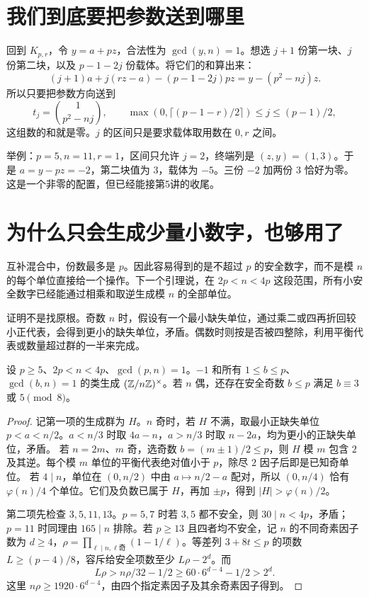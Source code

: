 \section{我们到底要把参数送到哪里}
回到 $K_{p,r}$，令 $y=a+pz$，合法性为 $\gcd(y,n)=1$。想选 $j+1$ 份第一块、$j$ 份第二块，以及 $p-1-2j$ 份载体。将它们的和算出来：
\[
(j+1)a+j(rz-a)-(p-1-2j)pz=y-(p^2-nj)z.
\]
所以只要把参数方向送到
\begin{equation}\label{eq:terminal}
t_j=\binom{1}{p^2-nj},\qquad
\max(0,\lceil(p-1-r)/2\rceil)\le j\le(p-1)/2,
\end{equation}
这组数的和就是零。$j$ 的区间只是要求载体取用数在 $0,r$ 之间。

举例：$p=5,n=11,r=1$，区间只允许 $j=2$，终端列是 $(z,y)=(1,3)$。于是 $a=y-pz=-2$，第二块值为 $3$，载体为 $-5$。三份 $-2$ 加两份 $3$ 恰好为零。这是一个非零的配置，但已经能接第5讲的收尾。

\section{为什么只会生成少量小数字，也够用了}
互补混合中，份数最多是 $p$。因此容易得到的是不超过 $p$ 的安全数字，而不是模 $n$ 的每个单位直接给一个操作。下一个引理说，在 $2p<n<4p$ 这段范围，所有小安全数字已经能通过相乘和取逆生成模 $n$ 的全部单位。

证明不是找原根。奇数 $n$ 时，假设有一个最小缺失单位，通过乘二或四再折回较小正代表，会得到更小的缺失单位，矛盾。偶数时则按是否被四整除，利用平衡代表或数量超过群的一半来完成。
\begin{lemma}[小数字生成模n单位群]\label{lem:small-units}
设 $p\ge5$、$2p<n<4p$、$\gcd(p,n)=1$。$-1$ 和所有 $1\le b\le p$、$\gcd(b,n)=1$ 的类生成 $(\mathbb Z/n\mathbb Z)^\times$。若 $n$ 偶，还存在安全奇数 $b\le p$ 满足 $b\equiv3$ 或 $5\pmod8$。
\end{lemma}
\begin{proof}
记第一项的生成群为 $H$。$n$ 奇时，若 $H$ 不满，取最小正缺失单位 $p<a<n/2$。$a<n/3$ 时取 $4a-n$，$a>n/3$ 时取 $n-2a$，均为更小的正缺失单位，矛盾。
若 $n=2m$、$m$ 奇，选奇数 $b=(m\pm1)/2\le p$，则 $H$ 模 $m$ 包含 $2$ 及其逆。每个模 $m$ 单位的平衡代表绝对值小于 $p$，除尽 $2$ 因子后即是已知奇单位。
若 $4\mid n$，单位在 $(0,n/2)$ 中由 $a\mapsto n/2-a$ 配对，所以 $(0,n/4)$ 恰有 $\varphi(n)/4$ 个单位。它们及负数已属于 $H$，再加 $\pm p$，得到 $|H|>\varphi(n)/2$。

第二项先检查 $3,5,11,13$。$p=5,7$ 时若 $3,5$ 都不安全，则 $30\mid n<4p$，矛盾；$p=11$ 时同理由 $165\mid n$ 排除。若 $p\ge13$ 且四者均不安全，记 $n$ 的不同奇素因子数为 $d\ge4$，$\rho=\prod_{\ell\mid n,\ell\text{奇}}(1-1/\ell)$。等差列 $3+8t\le p$ 的项数 $L\ge(p-4)/8$，容斥给安全项数至少 $L\rho-2^d$。而
\[
L\rho>n\rho/32-1/2\ge60\cdot6^{d-4}-1/2>2^d.
\]
这里 $n\rho\ge1920\cdot6^{d-4}$，由四个指定素因子及其余奇素因子得到。
\end{proof}

